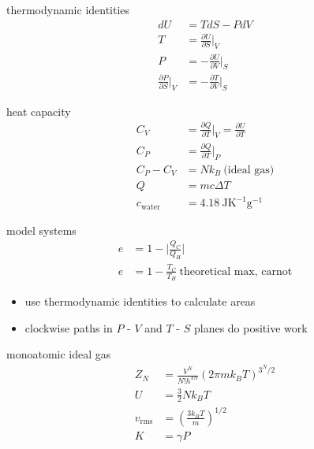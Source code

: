 \documentclass[avery5388, frame]{flashcards}
\begin{document}
\begin{flashcard}{thermodynamic identities}
  {
    \begin{align*}
      dU &= T dS - P dV\\
      T &= \frac{\partial U}{\partial S} \rvert_{V}\\
      P & = - \frac{\partial U}{\partial V} \rvert_{S}\\
      \frac{\partial P}{\partial S} \rvert_{V} &= - \frac{\partial T}{\partial V} \rvert_{S}
    \end{align*}
  }
\end{flashcard}

\begin{flashcard}{heat capacity}
  {
    \begin{align*}
      C_{V} &= \frac{\partial Q}{\partial T} \rvert_{V} = \frac{\partial U}{\partial T}\\
      C_{P} &= \frac{\partial Q}{\partial T} \rvert_{P}\\
      C_{P} - C_{V} &= N k_{B} \ \textrm{(ideal gas)}\\
      Q &= m c \Delta T\\
      c_{\textrm{water}} &= 4.18 \ \textrm{J} \textrm{K}^{-1} \textrm{g}^{-1}
    \end{align*}
  }
\end{flashcard}

\begin{flashcard}{model systems}
  {
    \begin{align*}
      e &= 1 - \lvert \frac{Q_{C}}{Q_{H}} \rvert\\
      e &= 1 - \frac{T_{C}}{T_{H}} \ \textrm{theoretical max, carnot}
    \end{align*}
  }
  \begin{itemize}
    \item use thermodynamic identities to calculate areas
    \item clockwise paths in $P$ - $V$ and $T$ - $S$ planes do positive work
  \end{itemize}
\end{flashcard}

\begin{flashcard}{monoatomic ideal gas}
  {
    \begin{align*}
      Z_{N} &= \frac{V^{N}}{N! h^{3N}}(2 \pi m k_{B} T)^{3^{N}/2}\\
      U &= \frac{3}{2} N k_{B} T\\
      v_{\textrm{rms}} &= (\frac{3 k_{B} T}{m})^{1/2}\\
      K &= \gamma P
    \end{align*}
  }
\end{flashcard}
\end{document}
